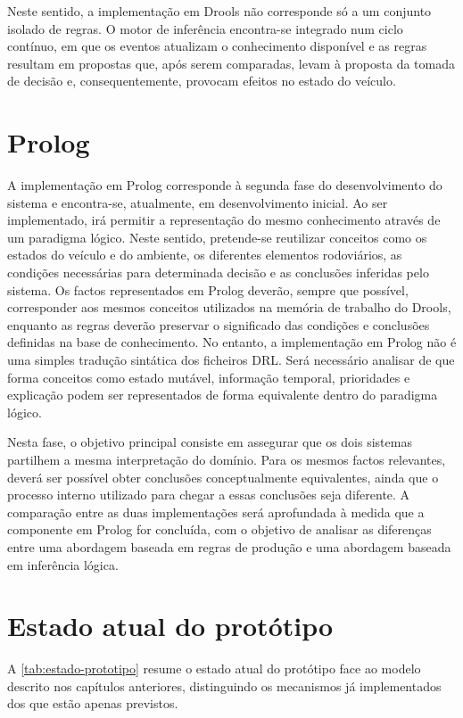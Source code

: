 Neste sentido, a implementação em Drools não corresponde só a um conjunto
isolado de regras. O motor de inferência encontra-se integrado num ciclo
contínuo, em que os eventos atualizam o conhecimento disponível e as regras
resultam em propostas que, após serem comparadas, levam à proposta da tomada
de decisão e, consequentemente, provocam efeitos no estado do veículo.

\section{Prolog}
\label{sec:prolog}

A implementação em Prolog corresponde à segunda fase do desenvolvimento do
sistema e encontra-se, atualmente, em desenvolvimento inicial. Ao ser
implementado, irá permitir a representação do mesmo conhecimento através de
um paradigma lógico. Neste sentido, pretende-se reutilizar conceitos como os
estados do veículo e do ambiente, os diferentes elementos rodoviários, as
condições necessárias para determinada decisão e as conclusões inferidas pelo
sistema. Os factos representados em Prolog deverão, sempre que possível,
corresponder aos mesmos conceitos utilizados na memória de trabalho do
Drools, enquanto as regras deverão preservar o significado das condições e
conclusões definidas na base de conhecimento. No entanto, a implementação em
Prolog não é uma simples tradução sintática dos ficheiros DRL. Será
necessário analisar de que forma conceitos como estado mutável, informação
temporal, prioridades e explicação podem ser representados de forma
equivalente dentro do paradigma lógico.

Nesta fase, o objetivo principal consiste em assegurar que os dois sistemas
partilhem a mesma interpretação do domínio. Para os mesmos factos relevantes,
deverá ser possível obter conclusões conceptualmente equivalentes, ainda que o
processo interno utilizado para chegar a essas conclusões seja diferente. A
comparação entre as duas implementações será aprofundada à medida que a
componente em Prolog for concluída, com o objetivo de analisar as diferenças
entre uma abordagem baseada em regras de produção e uma abordagem baseada em
inferência lógica.

\section{Estado atual do protótipo}
\label{sec:estado-prototipo}

A \cref{tab:estado-prototipo} resume o estado atual do protótipo face ao
modelo descrito nos capítulos anteriores, distinguindo os mecanismos já
implementados dos que estão apenas previstos.

